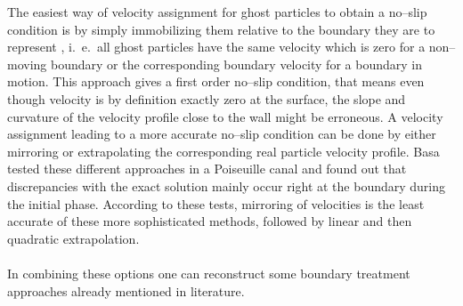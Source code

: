 \documentclass[11pt,a4paper,twoside]{report}
\begin{document}
The easiest way of velocity assignment for ghost particles to obtain a no--slip condition is by simply immobilizing them relative to the boundary they are to represent \cite{Morris1997}, i.\ e.\ all ghost particles have the same velocity which is zero for a non--moving boundary or the corresponding boundary velocity for a boundary in motion. This approach gives a first order 
no--slip condition, that means even though velocity is by definition exactly zero at the surface, the slope and curvature of the velocity profile close to the wall might be erroneous.  A velocity assignment leading to a more accurate no--slip condition can be done by either mirroring or extrapolating the corresponding real particle velocity profile. Basa \cite{Basa2009} tested these different approaches in a Poiseuille canal and found out that discrepancies with the exact solution mainly occur right at the boundary during the initial phase.  According to these tests, mirroring of velocities is the least accurate of these more sophisticated methods, followed by linear and then quadratic extrapolation. \\
\\
\indent
In combining these options one can reconstruct some boundary treatment approaches already mentioned in literature.
\end{document}
